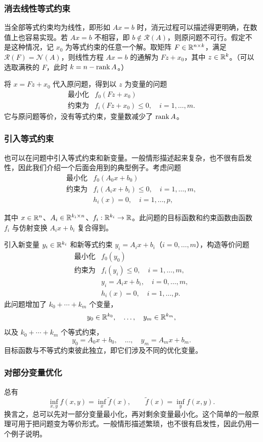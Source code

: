 \subsubsection*{消去线性等式约束}
当全部等式约束均为线性，即形如 $Ax=b$ 时，消元过程可以描述得更明确，在数值上也容易实现。若 $Ax=b$ 不相容，即 $b\notin\mathcal R(A)$，则原问题不可行。假定不是这种情况，记 $x_0$ 为等式约束的任意一个解。取矩阵 $F\in\mathbb R^{n\times k}$，满足 $\mathcal R(F)=\mathcal N(A)$，则线性方程 $Ax=b$ 的通解为 $Fz+x_0$，其中 $z\in\mathbb R^k$。（可以选取满秩的 $F$，此时 $k=n-\operatorname{rank} A$。）

将 $x=Fz+x_0$ 代入原问题，得到以 $z$ 为变量的问题
\[
\begin{array}{ll}
\text{最小化}&f_0(Fz+x_0)\\
\text{约束为}&f_i(Fz+x_0)\le0,\quad i=1,\ldots,m.
\end{array}
\]
它与原问题等价，没有等式约束，变量数减少了 $\operatorname{rank} A$。

\subsubsection*{引入等式约束}
也可以在问题中引入等式约束和新变量。一般情形描述起来复杂，也不很有启发性，因此我们介绍一个后面会用到的典型例子。考虑问题
\[
\begin{array}{ll}
\text{最小化}&f_0(A_0x+b_0)\\
\text{约束为}&f_i(A_ix+b_i)\le0,\quad i=1,\ldots,m,\\
&h_i(x)=0,\quad i=1,\ldots,p,
\end{array}
\]

其中 $x\in\mathbb R^n$、$A_i\in\mathbb R^{k_i\times n}$、$f_i:\mathbb R^{k_i}\to\mathbb R$。此问题的目标函数和约束函数由函数 $f_i$ 与仿射变换 $A_ix+b_i$ 复合得到。

引入新变量 $y_i\in\mathbb R^{k_i}$ 和新等式约束 $y_i=A_ix+b_i$（$i=0,\ldots,m$），构造等价问题
\[
\begin{array}{ll}
\text{最小化}&f_0(y_0)\\
\text{约束为}&f_i(y_i)\le0,\quad i=1,\ldots,m,\\
&y_i=A_ix+b_i,\quad i=0,\ldots,m,\\
&h_i(x)=0,\quad i=1,\ldots,p.
\end{array}
\]
此问题增加了 $k_0+\cdots+k_m$ 个变量，
\[
y_0\in\mathbb R^{k_0},\quad\ldots,\quad y_m\in\mathbb R^{k_m},
\]
以及 $k_0+\cdots+k_m$ 个等式约束，
\[
y_0=A_0x+b_0,\quad\ldots,\quad y_m=A_mx+b_m.
\]
目标函数与不等式约束彼此独立，即它们涉及不同的优化变量。

\subsubsection*{对部分变量优化}
总有
\[
\inf_{x,y}f(x,y)=\inf_x\widetilde f(x),\qquad\widetilde f(x)=\inf_y f(x,y).
\]
换言之，总可以先对一部分变量最小化，再对剩余变量最小化。这个简单的一般原理可用于把问题变为等价形式。一般情形描述繁琐，也不很有启发性，因此仍用一个例子说明。

